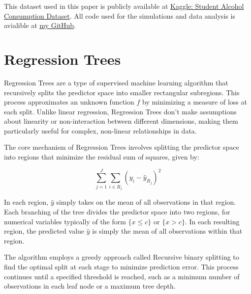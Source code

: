 \documentclass[12pt]{article}
\begin{document}
This dataset used in this paper is publicly available at \href{https://www.kaggle.com/datasets/uciml/student-alcohol-consumption}{Kaggle: Student Alcohol Consumption Dataset}. All code used for the simulations and data analysis is avialible at \href{https://github.com/Tim2othy/wissenschaftliches-arbeiten}{my GitHub}.



\section{Regression Trees}

Regression Trees are a type of supervised machine learning algorithm that recursively splits the predictor space into smaller rectangular subregions. This process approximates an unknown function $f$ by minimizing a measure of loss at each split. Unlike linear regression, Regression Trees don't make assumptions about linearity or non-interaction between different dimensions, making them particularly useful for complex, non-linear relationships in data.

The core mechanism of Regression Trees involves splitting the predictor space into regions that minimize the residual sum of squares, given by:

\begin{equation}
    \sum_{j=1}^{J} \sum_{i \in R_j} ( y_i- \hat{y}_{R_j})^2
\end{equation}



In each region, $\hat{y}$ simply takes on the mean of all observations in that region. Each branching of the tree divides the predictor space into two regions, for numerical variables typically of the form $\{x \le c\}$ or $\{x > c\}$. In each resulting region, the predicted value $\hat{y}$ is simply the mean of all observations within that region.

The algorithm employs a greedy approach called Recursive binary splitting to find the optimal split at each stage to minimize prediction error. This process continues until a specified threshold is reached, such as a minimum number of observations in each leaf node or a maximum tree depth.
\end{document}
